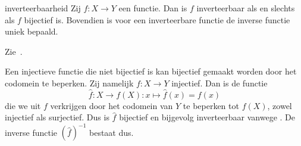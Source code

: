 \begin{stelling}{}{inverteerbaarheid}
    Zij $f: X \to Y$ een functie.
    Dan is $f$ inverteerbaar als en slechts als $f$ bijectief is.
    Bovendien is voor een inverteerbare functie de inverse functie uniek bepaald.
\end{stelling}
\begin{bewijs}{}{}
    Zie~\cite[p. 61]{cursus}.
\end{bewijs}

Een injectieve functie die niet bijectief is kan bijectief gemaakt worden door het codomein te beperken. Zij namelijk $f: X \to Y$ injectief.
Dan is de functie
\[
    \hat{f}: X \to f(X): x \mapsto \hat{f}(x) = f(x)
\] die we uit $f$ verkrijgen door het codomein van $Y$ te beperken tot $f(X)$, zowel injectief als surjectief.
Dus is $\hat{f}$ bijectief en bijgevolg inverteerbaar vanwege .
De inverse functie ${(\hat{f})}^{-1}$ bestaat dus.
